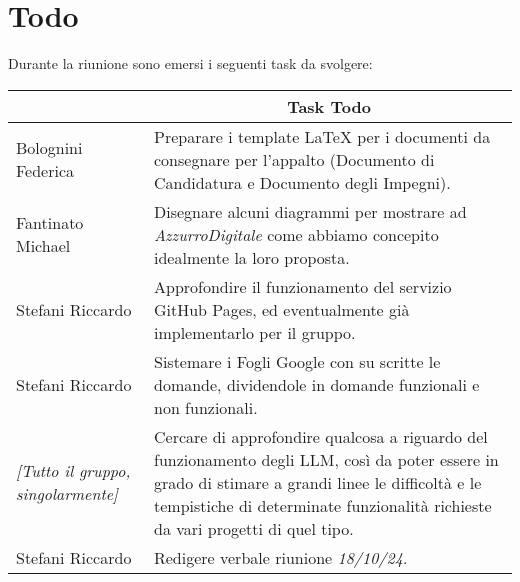 \section{Todo}

Durante la riunione sono emersi i seguenti task da svolgere:

\vspace{0.5cm}

\begin{table}[htbp]
\begin{tabular}{|p{}|p{}|}
    \hline
    \rowcolor[gray]{0.9}
    \multicolumn{1}{|c|}{\textbf{Assegnatario}} & \multicolumn{1}{|c|}{\textbf{Task Todo}} \\
    \hline
    Bolognini Federica & Preparare i template LaTeX per i documenti da consegnare per l'appalto (Documento di Candidatura e Documento degli Impegni). \\
    \hline
    Fantinato Michael & Disegnare alcuni diagrammi per mostrare ad \emph{AzzurroDigitale} come abbiamo concepito idealmente la loro proposta. \\
    \hline
    Stefani Riccardo & Approfondire il funzionamento del servizio GitHub Pages, ed eventualmente già implementarlo per il gruppo. \\
    \hline
    Stefani Riccardo & Sistemare i Fogli Google con su scritte le domande, dividendole in domande funzionali e non funzionali. \\
    \hline
    \emph{[Tutto il gruppo, singolarmente]} & Cercare di approfondire qualcosa a riguardo del funzionamento degli LLM, così da poter essere in grado di stimare a grandi linee le difficoltà e le tempistiche di determinate funzionalità richieste da vari progetti di quel tipo. \\
    \hline
    Stefani Riccardo & Redigere verbale riunione \emph{18/10/24}. \\
    \hline
\end{tabular}
\end{table}
